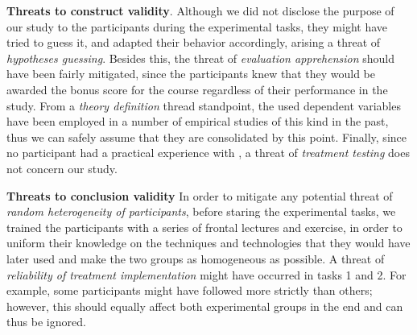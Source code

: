 \noindent\textbf{Threats to construct validity}.
Although we did not disclose the purpose of our study to the participants during the experimental tasks, they might have tried to guess it, and adapted their behavior accordingly, arising a threat of \textit{hypotheses guessing}. 
Besides this, the threat of \textit{evaluation apprehension} should have been fairly mitigated, since the participants knew that they would be awarded the bonus score for the course regardless of their performance in the study.
From a \textit{theory definition} thread standpoint, the used dependent variables have been employed in a number of empirical studies of this kind in the past, thus we can safely assume that they are consolidated by this point. Finally, since no participant had a practical experience with \tdd, a threat of \textit{treatment testing} does not concern our study.

\noindent\textbf{Threats to conclusion validity}
In order to mitigate any potential threat of \textit{random heterogeneity of participants}, before staring the experimental tasks, we trained the participants with a series of frontal lectures and exercise, in order to uniform their knowledge on the techniques and technologies that they would have later used and make the two groups as homogeneous as possible. 
A threat of \textit{reliability of treatment implementation} might have occurred in tasks 1 and 2. For example, some participants might have followed \tdd more strictly than others; however, this should equally affect both experimental groups in the end and can thus be ignored. 
